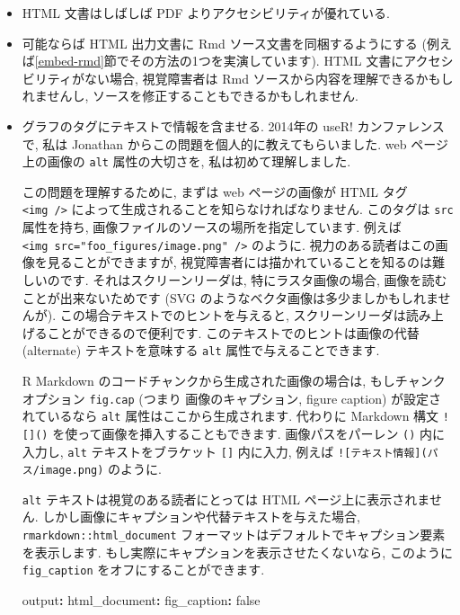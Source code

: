 \documentclass[
  11pt,
  lualatex,
  ja=standard]{bxjsreport}
\newenvironment{Shaded}{\begin{snugshade}}{\end{snugshade}}
\newcommand{\AttributeTok}[1]{\textcolor[rgb]{0.77,0.63,0.00}{#1}}
\newcommand{\CharTok}[1]{\textcolor[rgb]{0.31,0.60,0.02}{#1}}
\newcommand{\FunctionTok}[1]{\textcolor[rgb]{0.00,0.00,0.00}{#1}}
\newcommand{\KeywordTok}[1]{\textcolor[rgb]{0.13,0.29,0.53}{\textbf{#1}}}
\begin{document}
\begin{itemize}
\item
  HTML 文書はしばしば PDF よりアクセシビリティが優れている.
\item
  可能ならば HTML 出力文書に Rmd ソース文書を同梱するようにする (例えば\ref{embed-rmd}節でその方法の1つを実演しています). HTML 文書にアクセシビリティがない場合, 視覚障害者は Rmd ソースから内容を理解できるかもしれませんし, ソースを修正することもできるかもしれません.
\item
  グラフのタグにテキストで情報を含ませる. 2014年の useR! カンファレンスで, 私は Jonathan からこの問題を個人的に教えてもらいました. web ページ上の画像の \texttt{alt} 属性の大切さを, 私は初めて理解しました.

  この問題を理解するために, まずは web ページの画像が HTML タグ \texttt{\textless{}img\ /\textgreater{}} によって生成されることを知らなければなりません. このタグは \texttt{src} 属性を持ち, 画像ファイルのソースの場所を指定しています. 例えば \texttt{\textless{}img\ src="foo\_figures/image.png"\ /\textgreater{}} のように. 視力のある読者はこの画像を見ることができますが, 視覚障害者には描かれていることを知るのは難しいのです. それはスクリーンリーダは, 特にラスタ画像の場合, 画像を読むことが出来ないためです (SVG のようなベクタ画像は多少ましかもしれませんが). この場合テキストでのヒントを与えると, スクリーンリーダは読み上げることができるので便利です. このテキストでのヒントは画像の代替 (alternate) テキストを意味する \texttt{alt} 属性で与えることできます.

  R Markdown のコードチャンクから生成された画像の場合は, もしチャンクオプション \texttt{fig.cap} (つまり 画像のキャプション, figure caption) が設定されているなら \texttt{alt} 属性はここから生成されます. 代わりに Markdown 構文 \texttt{!{[}{]}()} を使って画像を挿入することもできます. 画像パスをパーレン \texttt{()} 内に入力し, \texttt{alt} テキストをブラケット \texttt{{[}{]}} 内に入力, 例えば \texttt{!{[}テキスト情報{]}(パス/image.png)} のように.

  \texttt{alt} テキストは視覚のある読者にとっては HTML ページ上に表示されません. しかし画像にキャプションや代替テキストを与えた場合, \texttt{rmarkdown::html\_document} フォーマットはデフォルトでキャプション要素を表示します. もし実際にキャプションを表示させたくないなら, このように \texttt{fig\_caption} をオフにすることができます.

\begin{Shaded}
\begin{Highlighting}[]
\FunctionTok{output}\KeywordTok{:}
\AttributeTok{  }\FunctionTok{html\_document}\KeywordTok{:}
\AttributeTok{    }\FunctionTok{fig\_caption}\KeywordTok{:}\AttributeTok{ }\CharTok{false}
\end{Highlighting}
\end{Shaded}


\end{itemize}
\end{document}
